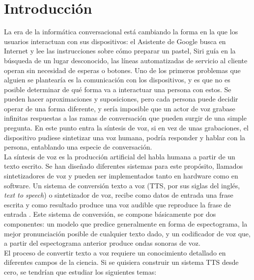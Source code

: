 \chapter*{Introducción}\label{chapter:introduction}

La era de la informática conversacional está cambiando la forma en la que los usuarios interactuan con sus dispositivos: el Asistente de Google busca en Internet y lee las instrucciones sobre cómo preparar un pastel, Siri guía en la búsqueda de un lugar desconocido, las líneas automatizadas de servicio al cliente operan sin necesidad de esperas o botones. Uno de los primeros problemas que alguien se plantearía es la comunicación con los dispositivos, y es que no es posible determinar de qué forma va a
interactuar una persona con estos. Se pueden hacer aproximaciones y suposiciones, pero cada persona puede decidir operar de una forma diferente, y sería imposible que un actor de voz grabase infinitas respuestas a las ramas de conversación que pueden surgir de una simple pregunta. En este punto entra la síntesis de voz, si en vez de unas grabaciones, el dispositivo pudiese sintetizar una voz humana, podría responder y hablar con la persona, entablando una especie de conversación.\\


La síntesis de voz es la producción artificial del habla humana a partir de un texto escrito. Se han diseñado diferentes sistemas para este propósito, llamados sintetizadores de voz y pueden ser implementados tanto en hardware como en software. Un sistema de conversión texto a voz (TTS, por sus siglas del inglés, \textit{text to speech}) o sintetizador de voz, recibe como datos de entrada una frase escrita y como resultado produce una voz audible que reproduce la frase de entrada . Este sistema de conversión, se compone básicamente por dos componentes: un modelo que predice generalmente en forma de espectograma, la mejor pronunciación posible de cualquier texto dado, y un codificador de voz que, a partir del espectograma anterior produce ondas sonoras de voz.\\

El proceso de convertir texto a voz requiere un conocimiento
detallado en diferentes campos de la ciencia. Si se quisiera construir un sistema TTS desde cero, se tendrían que estudiar los siguientes temas:

